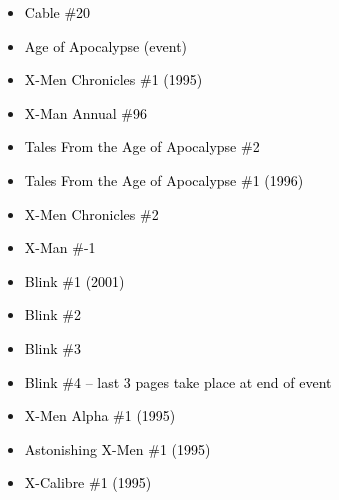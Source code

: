 \documentclass[12pt]{article}
\newcommand{\checkbox}{\raisebox{0.0ex}{\fbox{\rule{0ex}{1.5ex} \rule{1.5ex}{0ex}}}}
\begin{document}
\vspace{0.3cm}
\noindent
\begin{tcolorbox}[
  colback=white!95!gray,
  colframe=black,
  width=\textwidth,
  arc=4mm,
  auto outer arc,
  boxrule=0.8pt,
  left=8pt,right=8pt,top=8pt,bottom=8pt
]
\begin{itemize}[left=0pt,label={\checkbox}]
  \item \textcolor{black}{Cable \#20}
  \item \textcolor{black}{Age of Apocalypse (event)}
  \item \textcolor{black}{X-Men Chronicles \#1 (1995)}
  \item \textcolor{black}{X-Man Annual \#96}
  \item \textcolor{black}{Tales From the Age of Apocalypse \#2}
  \item \textcolor{black}{Tales From the Age of Apocalypse \#1 (1996)}
  \item \textcolor{black}{X-Men Chronicles \#2}
  \item \textcolor{black}{X-Man \#-1}
  \item \textcolor{black}{Blink \#1 (2001)}
  \item \textcolor{black}{Blink \#2}
  \item \textcolor{black}{Blink \#3}
  \item \textcolor{black}{Blink \#4 – last 3 pages take place at end of event}
  \item \textcolor{black}{X-Men Alpha \#1 (1995)}
  \item \textcolor{black}{Astonishing X-Men \#1 (1995)}
  \item \textcolor{black}{X-Calibre \#1 (1995)}
\end{itemize}
\end{tcolorbox}

\newpage
{}
\end{document}
